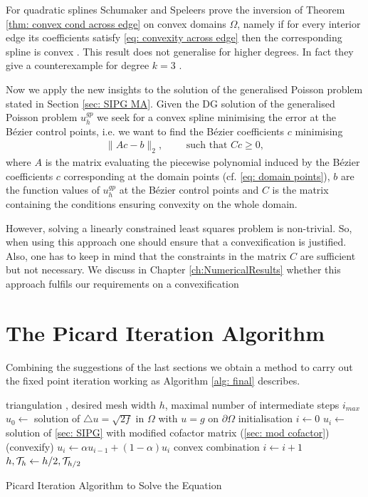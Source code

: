 For quadratic splines Schumaker and Speleers prove the inversion of Theorem \ref{thm: convex cond across edge} on convex domains $\Omega$, namely if for every interior edge its coefficients satisfy \eqref{eq: convexity across edge} then the corresponding spline is convex \cite[Corollary 3.10]{SS2014}.
This result does not generalise for higher degrees. In fact they give a counterexample for degree $k = 3$ \cite[Example 3.11]{SS2014}.

Now we apply the new insights to the solution of the generalised Poisson problem stated in Section \ref{sec: SIPG MA}.
Given the DG solution of the generalised Poisson problem $u^{gp}_h$ we seek for a convex spline minimising the error at the B\'ezier control points, i.e. we want to find the B\'ezier coefficients $c$ minimising
\begin{align}
		\lVert A c - b \rVert_2, \qquad \text{ such that } Cc \geq 0, \label{eq: convex lsq}
\end{align}
where $A$ is the matrix evaluating the piecewise polynomial induced by the B\'ezier coefficients $c$ corresponding  at the domain points (cf. \eqref{eq: domain points}), $b$ are the function values of $u^{gp}_h$ at the B\'ezier control points and $C$ is the matrix containing the conditions ensuring convexity on the whole domain.

However, solving a linearly constrained least squares problem is non-trivial. So, when using this approach one should ensure that a convexification is justified. Also, one has to keep in mind that the constraints in the matrix $C$ are sufficient but not necessary. We discuss in Chapter \ref{ch:NumericalResults} whether this approach fulfils our requirements on a convexification

\section{The Picard Iteration Algorithm} \label{sec: Picard Iteration Algo}

Combining the suggestions of the last sections we obtain a method to carry out the fixed point iteration working as Algorithm \ref{alg: final} describes.

\begin{algorithm}[H]
\begin{algorithmic}
\Require triangulation \triang, desired mesh width $h$, maximal number of intermediate steps $i_{max}$
\State $u_0\gets $ solution of  $
	\triangle u = \sqrt{2f} \text{ in } \Omega $ with $
	u = g \text{ on }\partial \Omega$ \Comment initialisation
	\State $i \gets 0$
		\State $u_i \gets$ solution of \ref{sec: SIPG} with modified cofactor matrix (\ref{sec: mod cofactor})
		\State (convexify)
		\State $u_i \gets \alpha u_{i-1} + (1-\alpha)u_i $ \Comment convex combination
		\State $i \gets i+1$
	\EndWhile
	\State $h, \mathcal{T}_h \gets h/2, \mathcal{T}_{h/2}$
\EndWhile
\end{algorithmic}
\caption{Picard Iteration Algorithm to Solve the \MA Equation}
\label{alg: final}
\end{algorithm}

